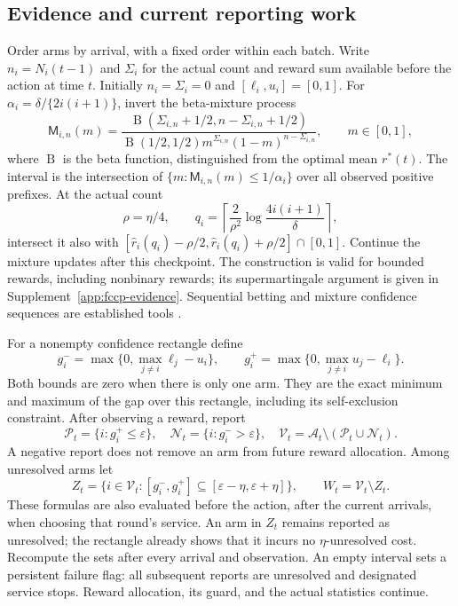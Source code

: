 \documentclass[11pt]{article}
\theoremstyle{remark}
\begin{document}
\subsection{Evidence and current reporting work}\label{sec:fccp-evidence}
Order arms by arrival, with a fixed order within each batch. Write
$n_i=N_i(t-1)$ and $\Sigma_i$ for the actual count and reward sum available
before the action at time $t$. Initially $n_i=\Sigma_i=0$ and
$[\ell_i,u_i]=[0,1]$. For $\alpha_i=\delta/\{2i(i+1)\}$, invert the
beta-mixture process
\begin{equation}\label{eq:fccp-mixture}
 \mathsf M_{i,n}(m)=
 \frac{\operatorname B(\Sigma_{i,n}+1/2,n-\Sigma_{i,n}+1/2)}
 {\operatorname B(1/2,1/2)m^{\Sigma_{i,n}}(1-m)^{n-\Sigma_{i,n}}},
 \qquad m\in[0,1],
\end{equation}
where $\operatorname B$ is the beta function, distinguished from the
optimal mean $r^*(t)$. The interval is the intersection of
$\{m:\mathsf M_{i,n}(m)\le1/\alpha_i\}$ over all observed positive
prefixes. At the actual count
\begin{equation}\label{eq:fccp-quota}
 \rho=\eta/4,\qquad
 q_i=\left\lceil\frac{2}{\rho^2}
             \log\frac{4i(i+1)}{\delta}\right\rceil,
\end{equation}
intersect it also with
$[\hat r_i(q_i)-\rho/2,\hat r_i(q_i)+\rho/2]\cap[0,1]$.
Continue the mixture updates after this checkpoint. The construction is
valid for bounded rewards, including nonbinary rewards; its supermartingale
argument is given in Supplement~\ref{app:fccp-evidence}. Sequential betting
and mixture confidence sequences are established tools
\citep{waudbysmith2024betting}.

For a nonempty confidence rectangle define
\begin{equation}\label{eq:fccp-gap}
 g_i^-=\max\{0,\max_{j\ne i}\ell_j-u_i\},\qquad
 g_i^+=\max\{0,\max_{j\ne i}u_j-\ell_i\}.
\end{equation}
Both bounds are zero when there is only one arm. They are the exact
minimum and maximum of the gap over this rectangle, including its
self-exclusion constraint. After observing a reward, report
\begin{equation}\label{eq:fccp-report}
 \mathcal P_t=\{i:g_i^+\le\varepsilon\},\quad
 \mathcal N_t=\{i:g_i^->\varepsilon\},\quad
 \mathcal V_t=\mathcal A_t\setminus(\mathcal P_t\cup\mathcal N_t).
\end{equation}
A negative report does not remove an arm from future reward allocation.
Among unresolved arms let
\begin{equation}\label{eq:fccp-work}
 Z_t=\{i\in\mathcal V_t:[g_i^-,g_i^+]
                 \subseteq[\varepsilon-\eta,\varepsilon+\eta]\},
 \qquad W_t=\mathcal V_t\setminus Z_t.
\end{equation}
These formulas are also evaluated before the action, after the current
arrivals, when choosing that round's service. An arm in $Z_t$ remains
reported as unresolved; the rectangle already shows that it incurs no
$\eta$-unresolved cost. Recompute the sets after every arrival and
observation. An empty interval sets a persistent failure flag: all
subsequent reports are unresolved and designated service stops. Reward
allocation, its guard, and the actual statistics continue.
\end{document}
